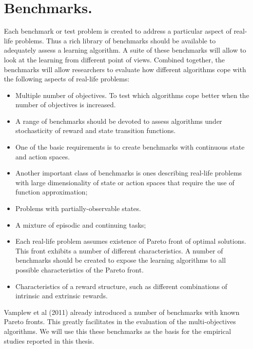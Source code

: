 \section{Benchmarks.}

Each benchmark or test problem is created to address a particular aspect of real-life problems. Thus a rich library of benchmarks should be available to adequately assess a learning algorithm. A suite of these benchmarks will allow to look at the learning from different point of views. Combined together, the benchmarks will allow researchers to evaluate how different algorithms cope with the following aspects of real-life problems:

\begin{itemize}

\item Multiple number of objectives. To test which algorithms cope better when the number of objectives is increased.

\item A range of benchmarks should be devoted to assess algorithms under stochasticity of reward and state transition functions.

\item One of the basic requirements is to create benchmarks with continuous state and action spaces.

\item Another important class of benchmarks is ones describing real-life problems with large dimensionality of state or action spaces that require the use of function approximation;

\item Problems with partially-observable states.

\item A mixture of episodic and continuing tasks;

\item Each real-life problem assumes existence of Pareto front of optimal solutions. This front exhibits a number of different characteristics. A number of benchmarks should be created to expose the learning algorithms to all possible characteristics of the Pareto front.

\item Characteristics of a reward structure, such as different combinations of intrinsic and extrinsic rewards.
\end{itemize}

Vamplew et al (2011)\nocite{vamplew2011empirical} already introduced a number of benchmarks with known Pareto fronts. This greatly facilitates in the evaluation of the multi-objectives algorithms. We will use this these benchmarks as the basis for the empirical studies reported in this thesis.

